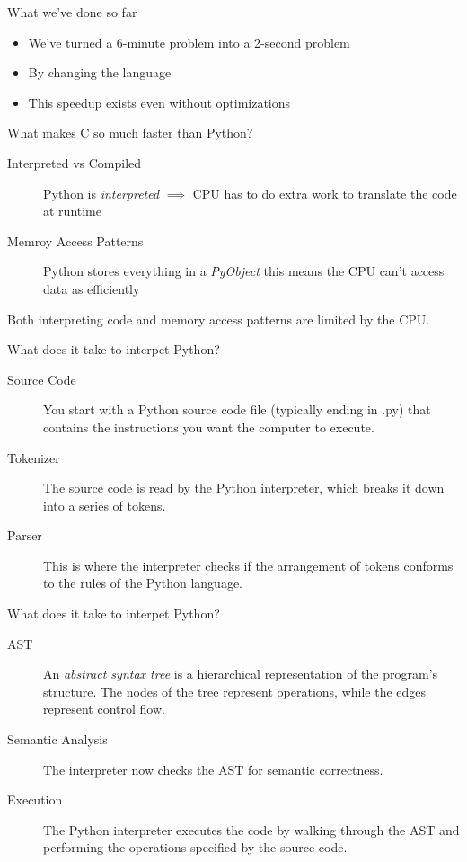 \documentclass[12pt, aspectration=169]{beamer}
\begin{document}
    \begin{frame}{What we've done so far}
        \begin{itemize}
            \item We've turned a 6-minute problem into a 2-second problem
            \item By changing the language
            \item This speedup exists even without optimizations
        \end{itemize}
    \end{frame}

    \begin{frame}{What makes C so much faster than Python?}
        \begin{description}
            \item[Interpreted vs Compiled] Python is \textit{interpreted} $\implies$ CPU has to do extra work to translate the code at runtime
            \item[Memroy Access Patterns] Python stores everything in a \textit{PyObject} this means the CPU can't access data as efficiently
        \end{description}
        Both interpreting code and memory access patterns are limited by the CPU.
    \end{frame}

    \begin{frame}{What does it take to interpet Python?}
        \begin{description}
            \item[Source Code] You start with a Python source code file (typically ending in .py) that contains the instructions you want the computer to execute.
            \item[Tokenizer] The source code is read by the Python interpreter, which breaks it down into a series of tokens.
            \item[Parser] This is where the interpreter checks if the arrangement of tokens conforms to the rules of the Python language.
        \end{description}
    \end{frame}

    \begin{frame}{What does it take to interpet Python?}
        \begin{description}
            \item[AST] An \textit{abstract syntax tree} is a hierarchical representation of the program's structure.
            The nodes of the tree represent operations, while the edges represent control flow.
            \item[Semantic Analysis] The interpreter now checks the AST for semantic correctness.
            \item[Execution] The Python interpreter executes the code by walking through the AST and performing the operations specified by the source code.
        \end{description}
    \end{frame}
\end{document}
